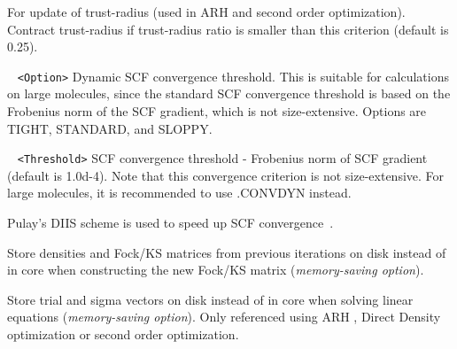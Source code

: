 \begin{description}
For update of trust-radius (used in ARH and second order optimization). Contract trust-radius
if trust-radius ratio is smaller than this criterion (default is 0.25).
\item[\Key{CONVDYN}] \verb| | \newline
\verb|<Option>|\newline 
Dynamic SCF convergence threshold. This is suitable for calculations on large molecules, since the standard SCF
convergence threshold is based on the Frobenius norm of the SCF gradient, which is not size-extensive.
Options are TIGHT, STANDARD, and SLOPPY.
\item[\Key{CONVTHR}] \verb| | \newline
\verb|<Threshold>|\newline
SCF convergence threshold - Frobenius norm of SCF gradient (default is 1.0d-4). 
Note that this convergence criterion
is not size-extensive. For large molecules, it is recommended to use .CONVDYN instead.
\item[\Key{DIIS}] Pulay's DIIS scheme is used to speed up SCF convergence~\cite{diis1,diis2}.
\item[\Key{DISK}] Store densities and Fock/KS matrices from previous 
iterations on disk instead of in core when constructing the new Fock/KS matrix ({\it memory-saving option}).
\item[\Key{DISKSOLVER}] Store trial and sigma vectors on disk instead of in core
when solving linear equations ({\it memory-saving option}). Only referenced using ARH
, Direct Density optimization or second order optimization.

\end{description}
